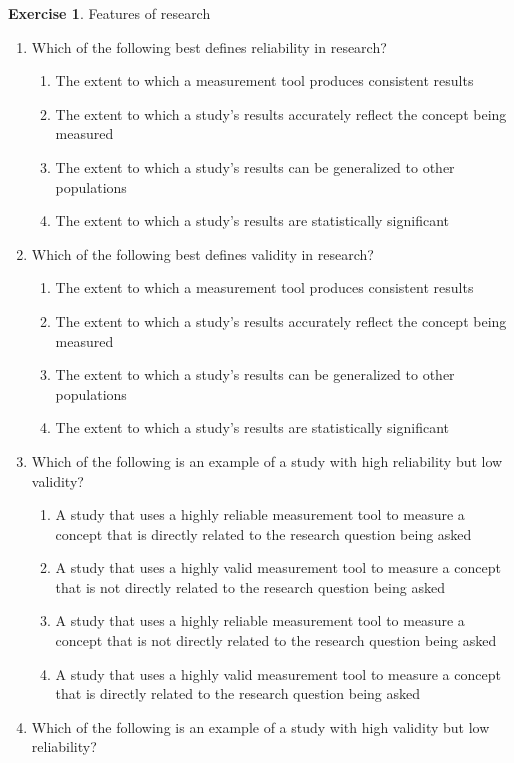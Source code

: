\documentclass[
  12pt,
  oneside]{book}
\providecommand{\tightlist}{%
  \setlength{\itemsep}{0pt}\setlength{\parskip}{0pt}}
\theoremstyle{definition}
\theoremstyle{definition}
\theoremstyle{definition}
\newtheorem{exercise}{Exercise}[chapter]
\theoremstyle{definition}
\theoremstyle{remark}
\begin{document}
\begin{exercise}
\protect\hypertarget{exr:featofresear}{}\label{exr:featofresear}Features of research

\begin{enumerate}
\def\labelenumi{\arabic{enumi}.}
\tightlist
\item
  Which of the following best defines reliability in research?

  \begin{enumerate}
  \def\labelenumii{\alph{enumii})}
  \tightlist
  \item
    The extent to which a measurement tool produces consistent results
  \item
    The extent to which a study's results accurately reflect the concept being measured
  \item
    The extent to which a study's results can be generalized to other populations
  \item
    The extent to which a study's results are statistically significant
  \end{enumerate}
\item
  Which of the following best defines validity in research?

  \begin{enumerate}
  \def\labelenumii{\alph{enumii})}
  \tightlist
  \item
    The extent to which a measurement tool produces consistent results
  \item
    The extent to which a study's results accurately reflect the concept being measured
  \item
    The extent to which a study's results can be generalized to other populations
  \item
    The extent to which a study's results are statistically significant
  \end{enumerate}
\item
  Which of the following is an example of a study with high reliability but low validity?

  \begin{enumerate}
  \def\labelenumii{\alph{enumii})}
  \tightlist
  \item
    A study that uses a highly reliable measurement tool to measure a concept that is directly related to the research question being asked
  \item
    A study that uses a highly valid measurement tool to measure a concept that is not directly related to the research question being asked
  \item
    A study that uses a highly reliable measurement tool to measure a concept that is not directly related to the research question being asked
  \item
    A study that uses a highly valid measurement tool to measure a concept that is directly related to the research question being asked
  \end{enumerate}
\item
  Which of the following is an example of a study with high validity but low reliability?


\end{enumerate}
\end{exercise}
\end{document}
